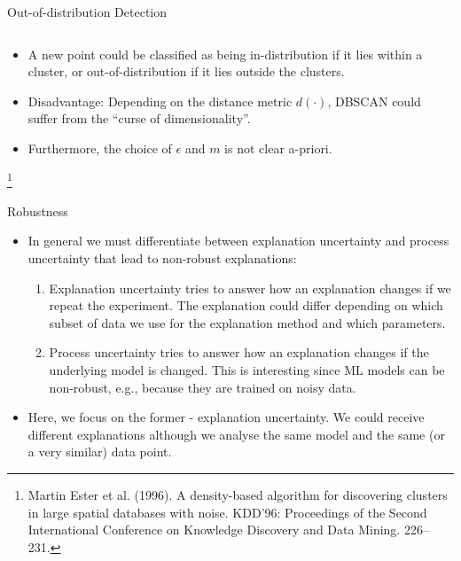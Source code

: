 \documentclass[11pt,compress,t,notes=noshow, aspectratio=169, xcolor=table]{beamer}
\begin{document}
\begin{frame}{Out-of-distribution Detection}
\begin{columns}
\begin{column}{0.27\textwidth}
\begin{center}
		\end{center}
	\end{column}
\end{columns}
\begin{itemize}
		\item A new point could be classified as being in-distribution if it lies within a cluster, or out-of-distribution if it lies outside the clusters. 
		\item Disadvantage: Depending on the distance metric $d(\cdot)$, DBSCAN could suffer from the ``curse of dimensionality''. 
		\item Furthermore, the choice of $\epsilon$ and $m$ is not clear a-priori. 
\end{itemize}
	\footnote[frame]{Martin Ester et al. (1996). A density-based algorithm for discovering clusters in large spatial databases with noise. KDD'96: Proceedings of the Second International Conference on Knowledge Discovery and Data Mining. 226–231.}
\end{frame}

\begin{vbframe}{Robustness}
		\begin{itemize}
		\item In general we must differentiate between explanation uncertainty and process uncertainty that lead to non-robust explanations: 
		\begin{enumerate}
			\item Explanation uncertainty tries to answer how an explanation changes if we repeat the experiment. The explanation could differ depending on which subset of data we use for the explanation method and which parameters. 
			\item Process uncertainty tries to answer how an explanation changes if the underlying model is changed. This is interesting since ML models can be non-robust, e.g., because they are trained on noisy data. 
		\end{enumerate}
		\item Here, we focus on the former - explanation uncertainty. We could receive different explanations although we analyse the same model and the same (or a very similar) data point.
	\end{itemize}
\end{vbframe}
\end{document}
